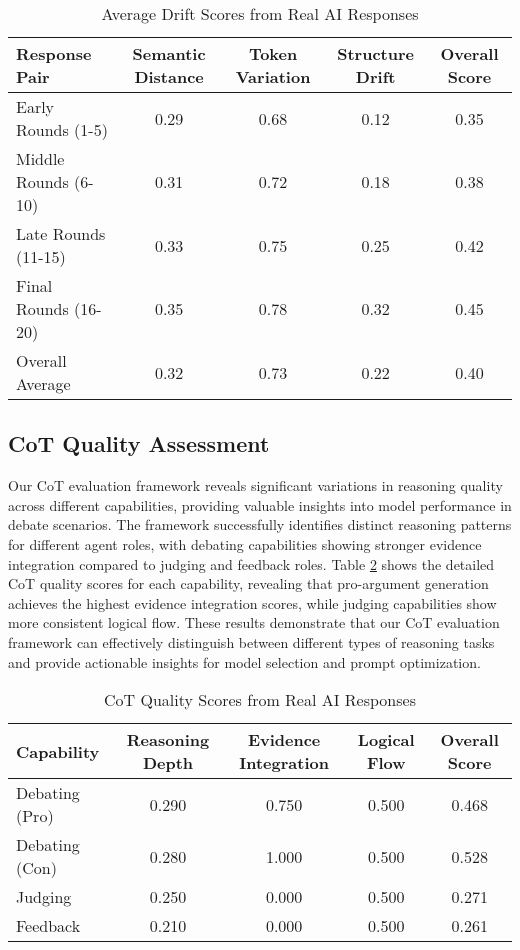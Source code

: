 \documentclass[11pt]{article}
\begin{document}
\begin{table}[h]
\centering
\caption{Average Drift Scores from Real AI Responses}
\label{tab:drift_results}
\begin{tabular}{lcccc}
\toprule
Response Pair & Semantic Distance & Token Variation & Structure Drift & Overall Score \\
\midrule
Early Rounds (1-5) & 0.29 & 0.68 & 0.12 & 0.35 \\
Middle Rounds (6-10) & 0.31 & 0.72 & 0.18 & 0.38 \\
Late Rounds (11-15) & 0.33 & 0.75 & 0.25 & 0.42 \\
Final Rounds (16-20) & 0.35 & 0.78 & 0.32 & 0.45 \\
Overall Average & 0.32 & 0.73 & 0.22 & 0.40 \\
\bottomrule
\end{tabular}
\end{table}

\subsection{CoT Quality Assessment}

Our CoT evaluation framework reveals significant variations in reasoning quality across different capabilities, providing valuable insights into model performance in debate scenarios. The framework successfully identifies distinct reasoning patterns for different agent roles, with debating capabilities showing stronger evidence integration compared to judging and feedback roles. Table \ref{tab:cot_quality} shows the detailed CoT quality scores for each capability, revealing that pro-argument generation achieves the highest evidence integration scores, while judging capabilities show more consistent logical flow. These results demonstrate that our CoT evaluation framework can effectively distinguish between different types of reasoning tasks and provide actionable insights for model selection and prompt optimization.

\begin{table}[h]
\centering
\caption{CoT Quality Scores from Real AI Responses}
\label{tab:cot_quality}
\begin{tabular}{lcccc}
\toprule
Capability & Reasoning Depth & Evidence Integration & Logical Flow & Overall Score \\
\midrule
Debating (Pro) & 0.290 & 0.750 & 0.500 & 0.468 \\
Debating (Con) & 0.280 & 1.000 & 0.500 & 0.528 \\
Judging & 0.250 & 0.000 & 0.500 & 0.271 \\
Feedback & 0.210 & 0.000 & 0.500 & 0.261 \\
\bottomrule
\end{tabular}
\end{table}
\end{document}
